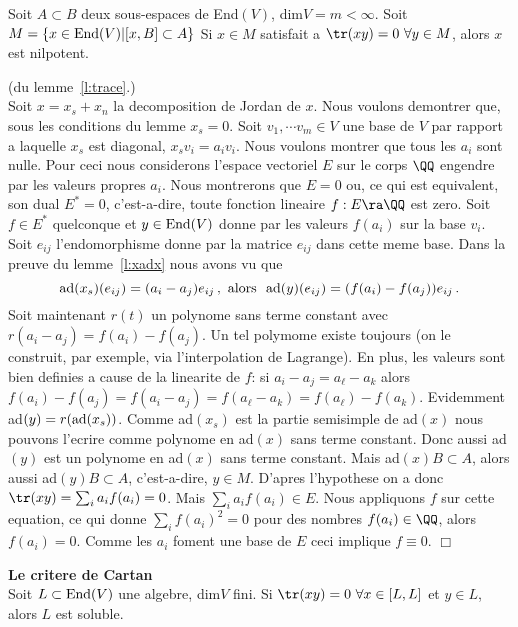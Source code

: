 \begin{lem}\label{l:trace} Soit $A\subset B$ deux sous-espaces de End$(V)$, dim$V =m<\infty$. Soit
$M = \{x\in{\rm End}(V)| [x,B]\subset A\}$ Si $x\in M$ satisfait a $\tr(xy)=0~\forall y\in M$, alors $x$ est nilpotent.
\end{lem}

\begin{prv}(du lemme~\ref{l:trace}.)\\
Soit $x=x_s+x_n$ la decomposition de Jordan de $x$. Nous voulons demontrer que, sous les conditions du lemme $x_s=0$. Soit $v_1,\cdots v_m\in V$ une base de $V$ par rapport a laquelle $x_s$ est diagonal, $x_sv_i =a_iv_i$.
Nous voulons montrer que tous les $a_i$ sont nulle. Pour ceci nous considerons l'espace vectoriel $E$ sur 
le corps $\QQ$ engendre par les valeurs propres $a_i$. Nous montrerons que $E= 0$ ou, ce qui est equivalent,
son dual $E^*=0$, c'est-a-dire, toute fonction lineaire $f:E\ra \QQ$ est zero. Soit $f\in E^*$ quelconque
et $y\in{\rm End}(V)$ 
donne par les valeurs $f(a_i)$ sur la base $v_i$. Soit $e_{ij}$ l'endomorphisme donne par la matrice $e_{ij}$ 
dans cette meme base. Dans la preuve du lemme~\ref{l:xadx} nous avons vu que
$$ {\rm ad}(x_s)(e_{ij}) = (a_i-a_j)e_{ij}\,, \mbox{ alors } ~ {\rm ad}(y)(e_{ij}) = (f(a_i)-f(a_j))e_{ij}\,.$$
Soit maintenant $r(t)$ un polynome sans terme constant avec $r(a_i-a_j) = f(a_i)-f(a_j)$. Un tel polymome existe toujours (on le construit, par exemple, via l'interpolation de Lagrange). En plus, les valeurs sont bien definies
a cause de la linearite de $f$: 
si $a_i-a_j = a_\ell-a_k$ alors $f(a_i)-f(a_j) = f(a_i-a_j)= f( a_\ell-a_k) =f( a_\ell)-f(a_k)$. 
Evidemment ad$(y) = r({\rm ad}(x_s))$.  Comme ad$(x_s)$ est la partie  semisimple de ad$(x)$ nous pouvons l'ecrire comme polynome en ad$(x)$ sans terme constant. Donc aussi ad$(y)$ est un polynome en ad$(x)$ sans terme constant. Mais ad$(x)B \subset A$, alors aussi ad$(y)B \subset A$, c'est-a-dire, $y\in M$. D'apres l'hypothese on a
donc $\tr(xy)= \sum_i a_if(a_i) = 0$. Mais $ \sum_i a_if(a_i) \in E$. Nous appliquons $f$ sur cette equation, ce qui donne
$\sum_i f(a_i)^2 =0$ pour des nombres $f(a_i)\in \QQ$, alors $f(a_i) =0$. Comme les $a_i$ foment une base de $E$ ceci implique $f\equiv 0$. \hfill $\Box$
\end{prv}

\begin{ttt} {\bf Le critere de Cartan}\label{t1:cartan}\\
Soit $L\subset {\rm End}(V)$ une algebre, dim$V$ fini. Si $\tr(xy)=0~\forall x\in [L,L]$ et $y\in L$, alors $L$ est soluble. 
\end{ttt}

